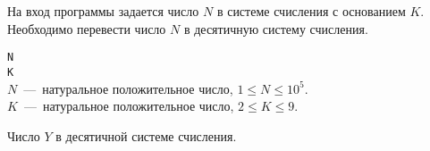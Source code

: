 На вход программы задается число $N$ в системе счисления с основанием $K$. Необходимо перевести число $N$ в десятичную систему счисления.

\InputFile

\noindent
\texttt{N} \\
\texttt{K} \\
$N$~---~натуральное положительное число, $1 \leq N \leq 10^5$. \\
$K$~---~натуральное положительное число, $2 \leq K \leq 9$.

\OutputFile

Число $Y$ в десятичной системе счисления.

\SAMPLES

